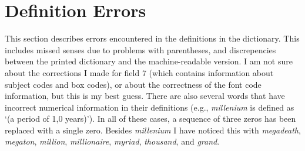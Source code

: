 \section{Definition Errors}
This section describes errors encountered in the definitions in the dictionary.
This includes missed senses due to problems with parentheses, and discrepencies
between the printed dictionary and the machine-readable version.  I am not 
sure about the corrections I made for field 7 (which contains information
about subject codes and box codes), or about the correctness of the font code
information, but this is my best guess.  There are also several words that
have incorrect numerical information in their definitions (e.g., {\em millenium}
is defined as `(a period of 1,0 years)').  In all of these cases, a sequence
of three zeros has been replaced with a single zero.  Besides {\em millenium}
I have noticed this with {\em megadeath}, {\em megaton}, {\em million}, 
{\em millionaire}, {\em myriad}, {\em thousand}, and {\em grand}.  

